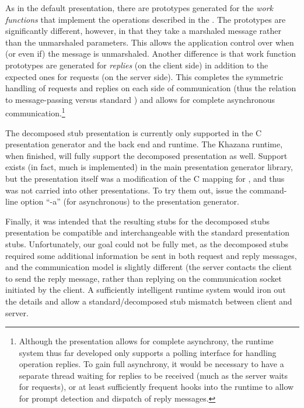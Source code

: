As in the default presentation, there are prototypes generated for the
\emph{work functions} that implement the operations described in the \IDL{}\@.
The prototypes are significantly different, however, in that they take a
marshaled message rather than the unmarshaled parameters.  This allows the
application control over when (or even if) the message is unmarshaled.  Another
difference is that work function prototypes are generated for \emph{replies}
(on the client side) in addition to the expected ones for requests (on the
server side).  This completes the symmetric handling of requests and replies on
each side of communication (thus the relation to message-passing versus
standard \RPC{}) and allows for complete asynchronous
communication.\footnote{Although the presentation allows for complete
asynchrony, the runtime system thus far developed only supports a polling
interface for handling operation replies.  To gain full asynchrony, it would be
necessary to have a separate thread waiting for replies to be received (much as
the server waits for requests), or at least sufficiently frequent hooks into
the runtime to allow for prompt detection and dispatch of reply messages.}

The decomposed stub presentation is currently only supported in the
\CORBA{} C presentation generator and the \IIOP{} back end and runtime.  The
Khazana runtime, when finished, will fully support the decomposed presentation
as well.  Support exists (in fact, much is implemented) in the main
presentation generator library, but the presentation itself was a modification
of the C mapping for \CORBA{}, and thus was not carried into other
presentations.  To try them out, issue the command-line option ``-a'' (for
asynchronous) to the presentation generator.

Finally, it was intended that the resulting stubs for the decomposed stubs
presentation be compatible and interchangeable with the standard \CORBA{}
presentation stubs.  Unfortunately, our goal could not be fully met, as the
decomposed stubs required some additional information be sent in both request
and reply messages, and the communication model is slightly different (the
server contacts the client to send the reply message, rather than replying on
the communication socket initiated by the client.  A sufficiently intelligent
runtime system would iron out the details and allow a standard/decomposed stub
mismatch between client and server.



